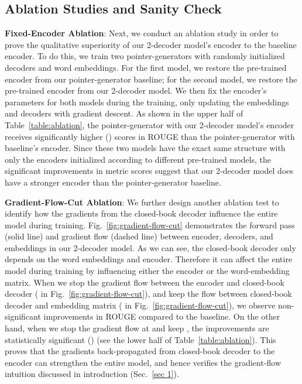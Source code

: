 \documentclass[11pt,a4paper]{article}
\def\figref#1{Fig.~\ref{#1}}
\def\tabref#1{Table~\ref{#1}}
\begin{document}
\subsection{Ablation Studies and Sanity Check}

\noindent\textbf{Fixed-Encoder Ablation}:
Next, we conduct an ablation study in order to prove the qualitative superiority of our 2-decoder model's encoder to the baseline encoder. To do this, we train two pointer-generators with randomly initialized decoders and word embeddings. For the first model, we restore the pre-trained encoder from our pointer-generator baseline; for the second model, we restore the pre-trained encoder from our 2-decoder model. We then fix the encoder's parameters for both models during the training, only updating the embeddings and decoders with gradient descent.
As shown in the upper half of \tabref{table:ablation}, the pointer-generator with our 2-decoder model's encoder receives significantly higher () scores in ROUGE than the pointer-generator with baseline's encoder. Since these two models have the exact same structure with only the encoders initialized according to different pre-trained models, the significant improvements in metric scores suggest that our 2-decoder model does have a stronger encoder than the pointer-generator baseline.

\noindent\textbf{Gradient-Flow-Cut Ablation}:
We further design another ablation test to identify how the gradients from the closed-book decoder influence the entire model during training. \figref{fig:gradient-flow-cut} demonstrates the forward pass (solid line) and gradient flow (dashed line) between encoder, decoders, and embeddings in our 2-decoder model. As we can see, the closed-book decoder only depends on the word embeddings and encoder. Therefore it can affect the entire model during training by influencing either the encoder or the word-embedding matrix. 
When we stop the gradient flow between the encoder and closed-book decoder (\raisebox{.5pt}{\textcircled{\raisebox{-.9pt} {1}}} in \figref{fig:gradient-flow-cut}), and keep the flow between closed-book decoder and embedding matrix (\raisebox{.5pt}{\textcircled{\raisebox{-.9pt} {2}}} in \figref{fig:gradient-flow-cut}), we observe non-significant improvements in ROUGE compared to the baseline. On the other hand, when we stop the gradient flow at \raisebox{.5pt}{\textcircled{\raisebox{-.9pt} {2}}} and keep \raisebox{.5pt}{\textcircled{\raisebox{-.9pt} {1}}}, the improvements are statistically significant () (see the lower half of \tabref{table:ablation}). This proves that the gradients back-propagated from closed-book decoder to the encoder can strengthen the entire model, and hence verifies the gradient-flow intuition discussed in introduction (Sec.~\ref{sec 1}).
\end{document}
